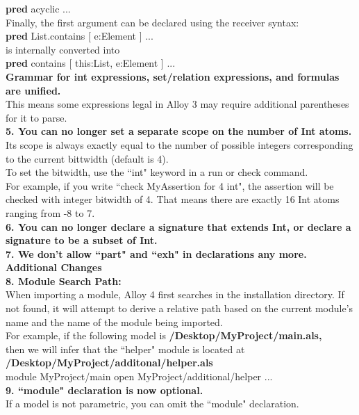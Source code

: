 \documentclass[a4paper,12pt]{extarticle}
\begin{document}
    \textbf{pred} acyclic {...} \\
Finally, the first argument can be declared using the receiver syntax:\\
    \textbf{pred} List.contains [ e:Element ] {...}\\
is internally converted into\\
   \textbf{pred} contains [ this:List, e:Element ] {...}\\
  \textbf{ Grammar for int expressions, set/relation expressions, and formulas are unified.}\\ 
This means some expressions legal in Alloy 3 may require additional parentheses for it to parse. \\

\textbf{5. You can no longer set a separate scope on the number of Int atoms. } \\
Its scope is always exactly equal to the number of possible integers corresponding to the current bittwidth (default is 4). \\
To set the bitwidth, use the ``int" keyword in a run or check command. \\
For example, if you write ``check MyAssertion for 4 int", the assertion will be checked with integer bitwidth of 4. That means there are exactly 16 Int atoms ranging from -8 to 7.\\
\textbf{6. You can no longer declare a signature that extends Int, or declare a signature to be a subset of Int. }\\
\textbf{7. We don't allow ``part" and ``exh" in declarations any more. }\\
\textbf{Additional Changes }\\
\textbf{8. Module Search Path: }\\
When importing a module, Alloy 4 first searches in the installation directory. If not found, it will attempt to derive a relative path based on the current module's name and the name of the module being imported. \\
For example, if the following model is \textbf{/Desktop/MyProject/main.als,}\\
then we will infer that the ``helper" module is located at \textbf{/Desktop/MyProject/additonal/helper.als} \\
   module MyProject/main
   open MyProject/additional/helper
   ...\\
 \textbf{9. ``module" declaration is now optional. } \\
If a model is not parametric, you can omit the ``module" declaration. \\
\end{document}
